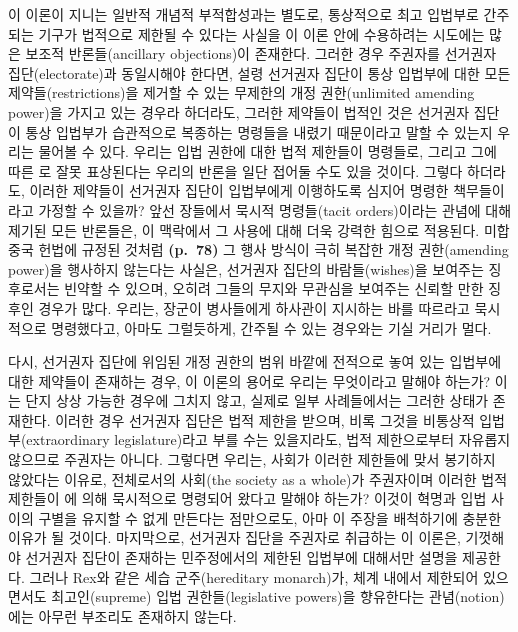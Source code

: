 이 이론이 지니는 일반적 개념적 부적합성과는 별도로, 통상적으로 최고
입법부로 간주되는 기구가 법적으로 제한될 수 있다는 사실을 이 이론 안에
수용하려는 시도에는 많은 보조적 반론들(ancillary objections)이 존재한다.
그러한 경우 주권자를 선거권자 집단(electorate)과 동일시해야 한다면, 설령
선거권자 집단이 통상 입법부에 대한 모든 제약들(restrictions)을 제거할 수
있는 무제한의 개정 권한(unlimited amending power)을 가지고 있는 경우라
하더라도, 그러한 제약들이 법적인 것은 선거권자 집단이 통상 입법부가
습관적으로 복종하는 명령들을 내렸기 때문이라고 말할 수 있는지 우리는
물어볼 수 있다. 우리는 입법 권한에 대한 법적 제한들이 명령들로, 그리고
그에 따른 로 잘못 표상된다는 우리의 반론을 일단
접어둘 수도 있을 것이다. 그렇다 하더라도, 이러한 제약들이 선거권자
집단이 입법부에게 이행하도록 심지어  명령한
책무들이라고 가정할 수 있을까? 앞선 장들에서 묵시적 명령들(tacit
orders)이라는 관념에 대해 제기된 모든 반론들은, 이 맥락에서 그 사용에
대해 더욱 강력한 힘으로 적용된다. 미합중국 헌법에 규정된 것처럼
\textbf{(p.~78)} 그 행사 방식이 극히 복잡한 개정 권한(amending power)을
행사하지 않는다는 사실은, 선거권자 집단의 바람들(wishes)을 보여주는
징후로서는 빈약할 수 있으며, 오히려 그들의 무지와 무관심을 보여주는
신뢰할 만한 징후인 경우가 많다. 우리는, 장군이 병사들에게 하사관이
지시하는 바를 따르라고 묵시적으로 명령했다고, 아마도 그럴듯하게, 간주될
수 있는 경우와는 기실 거리가 멀다.

다시, 선거권자 집단에 위임된 개정 권한의 범위 바깥에 전적으로 놓여 있는
입법부에 대한 제약들이 존재하는 경우, 이 이론의 용어로 우리는 무엇이라고
말해야 하는가? 이는 단지 상상 가능한 경우에 그치지 않고, 실제로 일부
사례들에서는 그러한 상태가 존재한다. 이러한 경우 선거권자 집단은 법적
제한을 받으며, 비록 그것을 비통상적 입법부(extraordinary
legislature)라고 부를 수는 있을지라도, 법적 제한으로부터 자유롭지
않으므로 주권자는 아니다. 그렇다면 우리는, 사회가 이러한 제한들에 맞서
봉기하지 않았다는 이유로, 전체로서의 사회(the society as a whole)가
주권자이며 이러한 법적 제한들이 에 의해 묵시적으로
명령되어 왔다고 말해야 하는가? 이것이 혁명과 입법 사이의 구별을 유지할
수 없게 만든다는 점만으로도, 아마 이 주장을 배척하기에 충분한 이유가 될
것이다. 마지막으로, 선거권자 집단을 주권자로 취급하는 이 이론은,
기껏해야 선거권자 집단이 존재하는 민주정에서의 제한된 입법부에 대해서만
설명을 제공한다. 그러나 Rex와 같은 세습 군주(hereditary monarch)가, 체계
내에서 제한되어 있으면서도 최고인(supreme) 입법 권한들(legislative
powers)을 향유한다는 관념(notion)에는 아무런 부조리도 존재하지 않는다.

